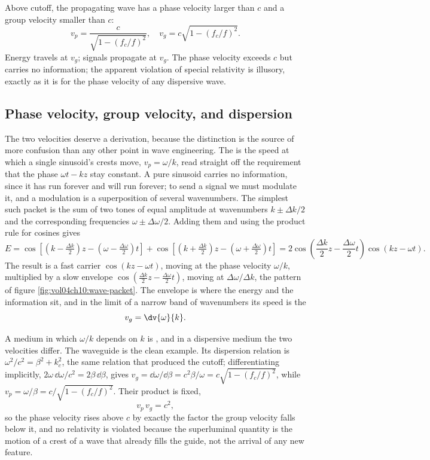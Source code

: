 Above cutoff, the propagating wave has a phase velocity larger than
$c$ and a group velocity smaller than $c$:
\[
v_{p} = \frac{c}{\sqrt{1-(f_{c}/f)^{2}}}, \quad v_{g} = c\sqrt{1-
(f_{c}/f)^{2}}.
\]
Energy travels at $v_{g}$; signals propagate at $v_{g}$. The phase
velocity exceeds $c$ but carries no information; the apparent
violation of special relativity is illusory, exactly as it is for
the phase velocity of any dispersive wave.



\subsection{Phase velocity, group velocity, and dispersion}

The two velocities deserve a derivation, because the distinction is the
source of more confusion than any other point in wave engineering. The
 is the speed at which a single sinusoid's
crests move, $v_p = \omega/k$, read straight off the requirement that
the phase $\omega t - kz$ stay constant. A pure sinusoid carries no
information, since it has run forever and will run forever; to send a
signal we must modulate it, and a modulation is a superposition of
several wavenumbers. The simplest such packet is the sum of two tones of
equal amplitude at wavenumbers $k\pm \Delta k/2$ and the corresponding
frequencies $\omega\pm \Delta\omega/2$. Adding them and using the
product rule for cosines gives
\[
E = \cos\!\left[(k-\tfrac{\Delta k}{2})z - (\omega -
\tfrac{\Delta\omega}{2})t\right] + \cos\!\left[(k+\tfrac{\Delta k}{2})z -
(\omega + \tfrac{\Delta\omega}{2})t\right] = 2\cos\!\left(\frac{\Delta k}
{2}z - \frac{\Delta\omega}{2}t\right)\cos(kz - \omega t).
\]
The result is a fast carrier $\cos(kz-\omega t)$, moving at the phase
velocity $\omega/k$, multiplied by a slow envelope $\cos(\tfrac{\Delta
k}{2}z - \tfrac{\Delta\omega}{2}t)$, moving at $\Delta\omega/\Delta k$,
the pattern of figure \ref{fig:vol04ch10:wave-packet}. The envelope is
where the energy and the information sit, and in the limit of a narrow
band of wavenumbers its speed is the 
\[
v_g = \dv{\omega}{k}.
\]



A medium in which $\omega/k$ depends on $k$ is , and
in a dispersive medium the two velocities differ. The waveguide is the
clean example. Its dispersion relation is $\omega^2/c^2 = \beta^2 +
k_c^2$, the same relation that produced the cutoff; differentiating
implicitly, $2\omega\,\dd\omega/c^2 = 2\beta\,\dd\beta$, gives $v_g =
\dd\omega/\dd\beta = c^2\beta/\omega = c\sqrt{1-(f_c/f)^2}$, while $v_p =
\omega/\beta = c/\sqrt{1-(f_c/f)^2}$. Their product is fixed,
\[
v_p\,v_g = c^2,
\]
so the phase velocity rises above $c$ by exactly the factor the group
velocity falls below it, and no relativity is violated because the
superluminal quantity is the motion of a crest of a wave that already
fills the guide, not the arrival of any new feature.

